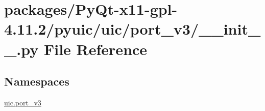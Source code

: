 \hypertarget{packages_2PyQt-x11-gpl-4_811_82_2pyuic_2uic_2port__v3_2____init_____8py}{}\section{packages/\+Py\+Qt-\/x11-\/gpl-\/4.11.2/pyuic/uic/port\+\_\+v3/\+\_\+\+\_\+init\+\_\+\+\_\+.py File Reference}
\label{packages_2PyQt-x11-gpl-4_811_82_2pyuic_2uic_2port__v3_2____init_____8py}
\subsection*{Namespaces}
\begin{DoxyCompactItemize}
\item 
 \hyperlink{namespaceuic_1_1port__v3}{uic.\+port\+\_\+v3}
\end{DoxyCompactItemize}
